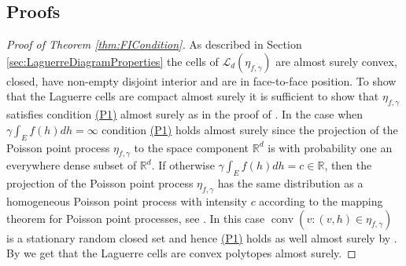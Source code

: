 \documentclass[11pt,a4paper]{article}
\theoremstyle{plain}
\theoremstyle{definition}
\theoremstyle{remark}
\def\RR{\mathbb{R}}
\def\cL{\mathcal{L}}
\newcommand{\conv}{\mathop{\mathrm{conv}}\nolimits}
\begin{document}
\subsection{Proofs}

\begin{proof}[Proof of Theorem \ref{thm:FICondition}]
    As described in Section \ref{sec:LaguerreDiagramProperties} the cells of $\cL_d(\eta_{f,\gamma})$ are almost surely convex, closed, have non-empty disjoint interior and are in face-to-face position. To show that the Laguerre cells are compact almost surely it is sufficient to show that $\eta_{f,\gamma}$ satisfies condition \hyperref[item:P1]{(P1)} almost surely as in the proof of \cite[Proposition~2.2.2]{Ldoc}. In the case when $\gamma\int_E f(h)dh=\infty$ condition \hyperref[item:P1]{(P1)} holds almost surely since the projection of the Poisson point process $\eta_{f,\gamma}$ to the space component $\RR^d$ is with probability one an everywhere dense subset of $\RR^d$. If otherwise $\gamma\int_E f(h)dh=c\in\RR$, then the projection of the Poisson point process $\eta_{f,\gamma}$ has the same distribution as a homogeneous Poisson point process with intensity $c$ according to the mapping theorem for Poisson point processes, see \cite[Theorem 5.1]{LP}. In this case $\conv(v:(v,h)\in \eta_{f,\gamma})$ is a stationary random closed set and hence \hyperref[item:P1]{(P1)} holds as well almost surely by \cite[Theorem 2.4.4]{SW}. By \cite[Lemma~10.1.1]{SW} we get that the Laguerre cells are convex polytopes almost surely.
    

\end{proof}
\end{document}

